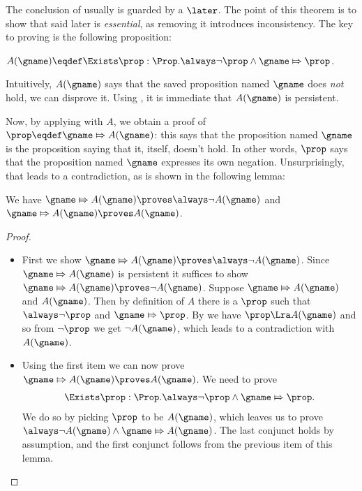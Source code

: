 The conclusion of  usually is guarded by a $\later$.
The point of this theorem is to show that said later is \emph{essential}, as removing it introduces inconsistency.
%
The key to proving  is the following proposition:
\begin{defn}
$A(\gname) \eqdef \Exists \prop : \Prop. \always\lnot \prop \land \gname \Mapsto \prop$.
\end{defn}
Intuitively, $A(\gname)$ says that the saved proposition named $\gname$ does \emph{not} hold, \ie we can disprove it.
Using , it is immediate that $A(\gname)$ is persistent.

Now, by applying  with $A$, we obtain a proof of $\prop \eqdef \gname \Mapsto A(\gname)$: this says that the proposition named $\gname$ is the proposition saying that it, itself, doesn't hold.
In other words, $\prop$ says that the proposition named $\gname$ expresses its own negation.
Unsurprisingly, that leads to a contradiction, as is shown in the following lemma:
\begin{lem}   \label{lem:saved-prop-counterexample-not-agname}   We have $\gname \Mapsto A(\gname) \proves \always\lnot A(\gname)$ and $\gname \Mapsto A(\gname) \proves A(\gname)$. \end{lem}
\begin{proof}%
\leavevmode
  \begin{itemize}
  \item First we show $\gname \Mapsto A(\gname) \proves \always\lnot A(\gname)$.
    Since $\gname \Mapsto A(\gname)$ is persistent it suffices to show $\gname \Mapsto A(\gname) \proves \lnot A(\gname)$.
    Suppose $\gname \Mapsto A(\gname)$ and $A(\gname)$.
    Then by definition of \(A\) there is a $\prop$ such that $\always \lnot \prop$ and $\gname \Mapsto \prop$.
    By  we have $\prop \Lra A(\gname)$ and so from $\lnot \prop$ we get $\lnot A(\gname)$, which leads to a contradiction with $A(\gname)$.
    
  \item Using the first item we can now prove $\gname \Mapsto A(\gname) \proves A(\gname)$.
    We need to prove
    \begin{align*}
      \Exists \prop : \Prop. \always \lnot \prop \land \gname \Mapsto \prop.
    \end{align*}
    We do so by picking $\prop$ to be $A(\gname)$, which leaves us to prove \(\always \lnot A(\gname) \land \gname \Mapsto A(\gname)\).
    The last conjunct holds by assumption, and the first conjunct follows from the previous item of this lemma.
  \end{itemize}
\end{proof}

